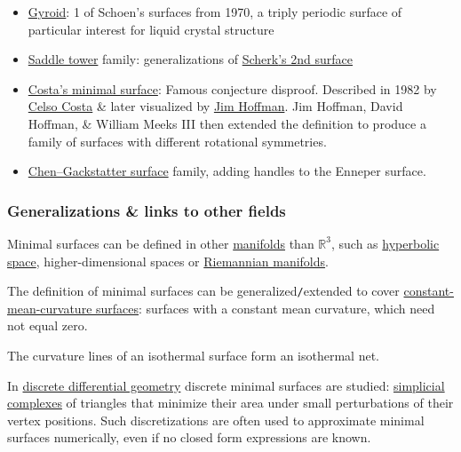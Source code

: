 \documentclass{article}
\begin{document}
\begin{itemize}
	\item \href{https://en.wikipedia.org/wiki/Gyroid}{Gyroid}: 1 of {\sc Schoen}'s surfaces from 1970, a triply periodic surface of particular interest for liquid crystal structure
	\item \href{https://en.wikipedia.org/wiki/Saddle_tower}{Saddle tower} family: generalizations of \href{https://en.wikipedia.org/wiki/Scherk_surface}{{\sc Scherk}'s 2nd surface}
	\item \href{https://en.wikipedia.org/wiki/Costa%27s_minimal_surface}{{\sc Costa}'s minimal surface}: Famous conjecture disproof. Described in 1982 by \href{https://en.wikipedia.org/wiki/Celso_Costa}{\sc Celso Costa} \& later visualized by \href{https://en.wikipedia.org/wiki/James_Hoffman}{\sc Jim Hoffman}. {\sc Jim Hoffman, David Hoffman, \& William Meeks III} then extended the definition to produce a family of surfaces with different rotational symmetries.
	\item \href{https://en.wikipedia.org/wiki/Chen%E2%80%93Gackstatter_surface}{Chen--Gackstatter surface} family, adding handles to the Enneper surface.
\end{itemize}

\subsubsection{Generalizations \& links to other fields}
Minimal surfaces can be defined in other \href{https://en.wikipedia.org/wiki/Manifolds}{manifolds} than $\mathbb{R}^3$, such as \href{https://en.wikipedia.org/wiki/Hyperbolic_space}{hyperbolic space}, higher-dimensional spaces or \href{https://en.wikipedia.org/wiki/Riemannian_manifolds}{Riemannian manifolds}.

The definition of minimal surfaces can be generalized{\tt/}extended to cover \href{https://en.wikipedia.org/wiki/Constant-mean-curvature_surface}{constant-mean-curvature surfaces}: surfaces with a constant mean curvature, which need not equal zero.

The curvature lines of an isothermal surface form an isothermal net.

In \href{https://en.wikipedia.org/wiki/Discrete_differential_geometry}{discrete differential geometry} discrete minimal surfaces are studied: \href{https://en.wikipedia.org/wiki/Simplicial_complex}{simplicial complexes} of triangles that minimize their area under small perturbations of their vertex positions. Such discretizations are often used to approximate minimal surfaces numerically, even if no closed form expressions are known.
\end{document}
